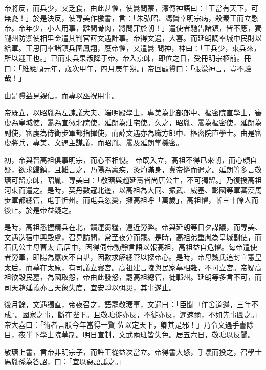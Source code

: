 \begin{pinyinscope}
 帝將反，而兵少，又乏食，由此甚懼，使暠問蒙，濛傳神語曰：「王當有天下，可無憂！」於是決反，使專美作檄書，言：「朱弘昭、馮贇幸明宗病，殺秦王而立愍帝。帝年少，小人用事，離間骨肉，將問罪於朝！」遣使者馳告諸鎮，皆不應，獨隴州防禦使相里金遣其判官薛文遇計事。帝得文遇，大喜。而延朗調率城中民財以給軍。王思同率諸鎮兵圍鳳翔，廢帝懼，又遣暠
 問神，神曰：「王兵少，東兵來，所以迎王也。」已而東兵果叛降于帝。帝入京師，即位之日，受冊明宗柩前。冊曰：「維應順元年，歲次甲午，四月庚午朔。」帝回顧贇曰：「張濛神言，豈不驗哉！」



 由是贇益見親信，而專以巫祝用事。



 帝既立，以昭胤為左諫議大夫、端明殿學士，專美為比部郎中、樞密院直學士，審虔為皇城使，暠為宣徽北院使，延朗為莊宅使。久之，昭胤、暠為樞密使，延朗為副使，審虔為侍衛步軍都指揮使，而薛文遇亦為職方郎中、樞密院直學士。由是審虔將兵，專美、文遇主謀議，而昭胤、暠及延朗掌機密。



 初，帝與晉高祖俱事明宗，而心不相悅。
 帝既入立，高祖不得已來朝，而心頗自疑，欲求歸鎮，且難言之，乃陽為羸疾，灸灼滿身，冀帝憐而遣之。延朗等多言敬瑭可留京師，昭胤、專美曰：「敬瑭與趙延壽皆尚唐公主，不可獨留。」乃復授高祖河東而遣之。是時，契丹數寇北邊，以高祖為大同、振武、威塞、彰國等軍蕃漢馬步軍都總管，屯于忻州。而屯兵忽變，擁高祖呼「萬歲」，高祖懼，斬三十餘人而後止。於是帝益疑之。



 是時，高祖悉握精兵在北，饋運芻糧，遠近勞弊。帝與延朗等日夕謀議，而專美、文遇迭宿中興殿盧，召見訪問，常至夜分而罷。是時，高祖弟重胤為皇城副使，而石氏公主母曹太
 后居中，因得伺帝動靜言語以報高祖，高祖益自危懼。每帝遣使者勞軍，即陽為羸疾不自堪，因數求解總管以探帝心。是時，帝母魏氏追封宣憲皇太后，而墓在太原，有司議立寢宮。高祖建言陵與民家墓相雜，不可立宮。帝疑高祖欲毀民墓，為國取怨，帝由此發怒，罷高祖總管，徙鄆州。延朗等多言不可，而司天趙延義亦言天象失度，宜安靜以弭災，其事遂止。



 後月餘，文遇獨直，帝夜召之，語罷敬瑭事，文遇曰：「臣聞『作舍道邊，三年不成』。國家之事，斷在陛下。且敬瑭徙亦反，不徙亦反，遲速爾，不如先事圖之。」帝大喜曰：「術者言朕今年當得一賢
 佐以定天下，卿其是邪！」乃令文遇手書除目，夜半下學士院草制。明日宣制，文武兩班皆失色。居五六日，敬瑭以反聞。



 敬瑭上書，言帝非明宗子，而許王從益次當立。帝得書大怒，手壞而投之，召學士馬胤孫為答詔，曰：「宜以惡語詆之。」




\end{pinyinscope}
